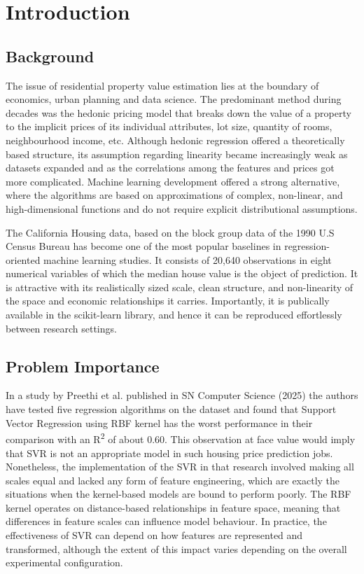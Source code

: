 \documentclass[pdflatex,sn-mathphys-num]{sn-jnl}
\begin{document}

\section{Introduction}
\subsection{Background}
The issue of residential property value estimation lies at the boundary of economics, urban planning and data science. The predominant method during decades was the hedonic pricing model that breaks down the value of a property to the implicit prices of its individual attributes, lot size, quantity of rooms, neighbourhood income, etc. Although hedonic regression offered a theoretically based structure, its assumption regarding linearity became increasingly weak as datasets expanded and as the correlations among the features and prices got more complicated. Machine learning development offered a strong alternative, where the algorithms are based on approximations of complex, non-linear, and high-dimensional functions and do not require explicit distributional assumptions.

The California Housing data, based on the block group data of the 1990 U.S Census Bureau has become one of the most popular baselines in regression-oriented machine learning studies. It consists of 20,640 observations in eight numerical variables of which the median house value is the object of prediction. It is attractive with its realistically sized scale, clean structure, and non-linearity of the space and economic relationships it carries. Importantly, it is publically available in the scikit-learn library, and hence it can be reproduced effortlessly between research settings.


\subsection{Problem Importance}
In a study by Preethi et al. published in SN Computer Science (2025) the authors have tested five regression algorithms on the dataset and found that Support Vector Regression using RBF kernel has the worst performance in their comparison with an R\textsuperscript{2} of about 0.60. This observation at face value would imply that SVR is not an appropriate model in such housing price prediction jobs. Nonetheless, the implementation of the SVR in that research involved making all scales equal and lacked any form of feature engineering, which are exactly the situations when the kernel-based models are bound to perform poorly. The RBF kernel operates on distance-based relationships in feature space, meaning that differences in feature scales can influence model behaviour. In practice, the effectiveness of SVR can depend on how features are represented and transformed, although the extent of this impact varies depending on the overall experimental configuration.
\end{document}
